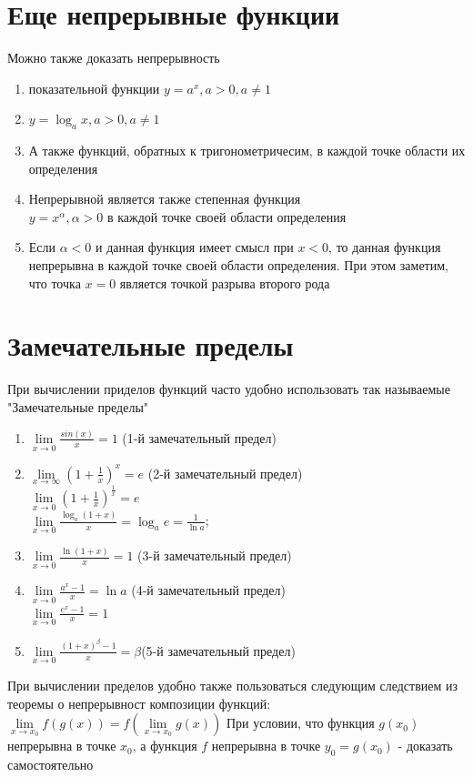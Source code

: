 \documentclass[oneside]{book}
\begin{document}
\begin{enumerate}
\section{Еще непрерывные функции}
Можно также доказать непрерывность
\begin{enumerate}
\item показательной функции $y=a^x, a>0, a \neq 1$
\item $y = \log_a x, a>0, a \neq 1$
\item А также функций, обратных к тригонометричесим, в каждой точке области их определения
\item Непрерывной является также степенная функция \\ $y=x^\alpha, \alpha > 0$ в каждой точке своей области определения
\item Если $\alpha < 0$ и данная функция имеет смысл при $x < 0$, то данная функция непрерывна в каждой точке своей области определения. При этом заметим, что точка $x=0$ является точкой разрыва второго рода
\end{enumerate}
\section{Замечательные пределы}
При вычислении приделов функций часто удобно использовать так называемые "Замечательные пределы"
\begin {enumerate}
\item $\lim\limits_{x\rightarrow 0}\frac{sin(x)}{x}=1$ (1-й замечательный предел)
\item $\lim\limits_{x\rightarrow \infty}(1+\frac{1}{x})^x=e$ (2-й замечательный предел)\\
$\lim\limits_{x\rightarrow 0}(1+\frac{1}{x})^{\frac{1}{x}}=e$
\\$\lim\limits_{x\rightarrow 0}\frac{\log_a(1+x)}{x}=\log_ae=\frac{1}{\ln a}$;
\item $\lim\limits_{x\rightarrow 0}\frac{\ln(1+x)}{x}=1$ (3-й замечательный предел)
\item $\lim\limits_{x\rightarrow 0}\frac{a^x-1}{x}=\ln a$ (4-й замечательный предел)\\
$\lim\limits_{x\rightarrow 0}\frac{e^x-1}{x}=1$
\item $\lim\limits_{x\rightarrow 0}\frac{(1+x)^\beta-1}{x}=\beta$(5-й замечательный предел)
\end{enumerate}
При вычислении пределов удобно также пользоваться следующим следствием из теоремы о непрерывност композиции функций:\\
$\lim \limits_{x\rightarrow x_0}f(g(x))=f(\lim \limits_{x\rightarrow x_0}g(x))$
При условии, что функция $g(x_0)$ непрерывна в точке $x_0$, а функция $f$ непрерывна в точке $y_0 = g(x_0)$ - доказать самостоятельно



\end{enumerate}
\end{document}

